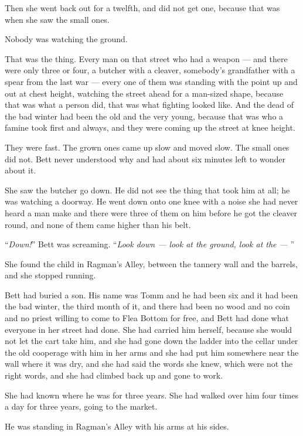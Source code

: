 Then she went back out for a twelfth, and did not get one, because that was when she saw the small ones.

\sceneBreak

Nobody was watching the ground.

That was the thing. Every man on that street who had a weapon — and there were only three or four, a butcher with a cleaver, somebody’s grandfather with a spear from the last war — every one of them was standing with the point up and out at chest height, watching the street ahead for a man-sized shape, because that was what a person did, that was what fighting looked like. And the dead of the bad winter had been the old and the very young, because that was who a famine took first and always, and they were coming up the street at knee height.

They were fast. The grown ones came up slow and moved slow. The small ones did not. Bett never understood why and had about six minutes left to wonder about it.

She saw the butcher go down. He did not see the thing that took him at all; he was watching a doorway. He went down onto one knee with a noise she had never heard a man make and there were three of them on him before he got the cleaver round, and none of them came higher than his belt.

“\textit{Down!}” Bett was screaming. “\textit{Look down — look at the ground, look at the — }”

\sceneBreak

She found the child in Ragman’s Alley, between the tannery wall and the barrels, and she stopped running.

Bett had buried a son. His name was Tomm and he had been six and it had been the bad winter, the third month of it, and there had been no wood and no coin and no priest willing to come to Flea Bottom for free, and Bett had done what everyone in her street had done. She had carried him herself, because she would not let the cart take him, and she had gone down the ladder into the cellar under the old cooperage with him in her arms and she had put him somewhere near the wall where it was dry, and she had said the words she knew, which were not the right words, and she had climbed back up and gone to work.

She had known where he was for three years. She had walked over him four times a day for three years, going to the market.

He was standing in Ragman’s Alley with his arms at his sides.

